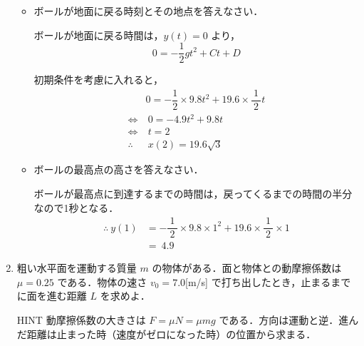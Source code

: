 \documentclass[a4paper,11pt]{ltjsarticle}
\begin{document}
\begin{enumerate}
\begin{itemize}
    \item ボールが地面に戻る時刻とその地点を答えなさい．
    
    ボールが地面に戻る時間は，$y(t)=0$ より，
    \begin{equation*}
      0=-\dfrac{1}{2}gt^{2}+Ct+D
    \end{equation*}

\clearpage

    初期条件を考慮に入れると，
    \begin{equation*}
      \begin{aligned}
        & 0=-\dfrac{1}{2} \times 9.8t^{2}+19.6 \times \dfrac{1}{\ 2\ }t \\
        \Leftrightarrow &\ 0=-4.9t^{2}+9.8t \\
        \Leftrightarrow &\ t=2 \\
        \therefore &\ x(2)=19.6 \sqrt{3}
      \end{aligned}
    \end{equation*}

    \item ボールの最高点の高さを答えなさい．
    
    ボールが最高点に到達するまでの時間は，戻ってくるまでの時間の半分なので1秒となる．
    \begin{equation*}
      \begin{aligned}
        \therefore \ y(1) &= -\dfrac{1}{\ 2\ } \times 9.8 \times 1^{2} + 19.6 \times \dfrac{1}{\ 2\ } \times 1 \\
        &=\ 4.9
      \end{aligned}
    \end{equation*}
  \end{itemize}

  \item 粗い水平面を運動する質量 $m$ の物体がある．面と物体との動摩擦係数は $\mu = 0.25$ である．物体の速さ $v_{0}=7.0$[m/s] で打ち出したとき，止まるまでに面を進む距離 $L$ を求めよ．\\[-10pt]
  \item[HINT] 動摩擦係数の大きさは $F=\mu N=\mu mg$ である．方向は運動と逆．進んだ距離は止まった時（速度がゼロになった時）の位置から求まる．


\end{enumerate}
\end{document}
